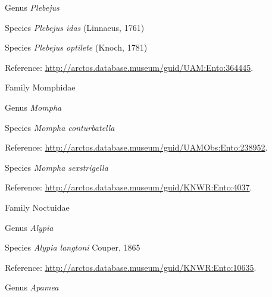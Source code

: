 \documentclass[9pt, article]{memoir}
\begin{document}
\begin{multicols}{2}
\vspace{6pt}\noindent\hspace{30pt}Genus \textit{Plebejus}


\vspace{6pt}\noindent\hspace{36pt}Species \textit{Plebejus idas} (Linnaeus, 1761)


\vspace{6pt}\noindent\hspace{36pt}Species \textit{Plebejus optilete} (Knoch, 1781)


\vspace{6pt}Reference: 
\url{http://arctos.database.museum/guid/UAM:Ento:364445}.

\vspace{6pt}\noindent\hspace{24pt}Family Momphidae


\vspace{6pt}\noindent\hspace{30pt}Genus \textit{Mompha}


\vspace{6pt}\noindent\hspace{36pt}Species \textit{Mompha conturbatella}


\vspace{6pt}Reference: 
\url{http://arctos.database.museum/guid/UAMObs:Ento:238952}.

\vspace{6pt}\noindent\hspace{36pt}Species \textit{Mompha sexstrigella}


\vspace{6pt}Reference: 
\url{http://arctos.database.museum/guid/KNWR:Ento:4037}.

\vspace{6pt}\noindent\hspace{24pt}Family Noctuidae


\vspace{6pt}\noindent\hspace{30pt}Genus \textit{Alypia}


\vspace{6pt}\noindent\hspace{36pt}Species \textit{Alypia langtoni} Couper, 1865


\vspace{6pt}Reference: 
\url{http://arctos.database.museum/guid/KNWR:Ento:10635}.

\vspace{6pt}\noindent\hspace{30pt}Genus \textit{Apamea}



\end{multicols}
\end{document}
